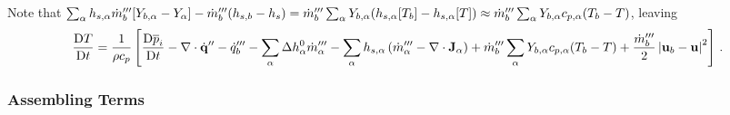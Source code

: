 \documentclass[11pt]{book}
\begin{document}
Note that $\sum_\alpha h_{s,\alpha} \dot{m}_{b}^{{\prime\prime\prime}}[Y_{b,\alpha} - Y_\alpha] - \dot{m}_{b}^{{\prime\prime\prime}} ( h_{s,b} - h_s ) = \dot{m}_{b}^{{\prime\prime\prime}} \sum_\alpha Y_{b,\alpha} (h_{s,\alpha}[T_b] - h_{s,\alpha}[T]) \approx \dot{m}_{b}^{{\prime\prime\prime}} \sum_\alpha Y_{b,\alpha} c_{p,\alpha}(T_b-T)$, leaving
\begin{equation}
\label{eqn_DTDt}
\frac{\mbox{D} T}{\mbox{D} t} = \frac{1}{\rho c_p} \left[\frac{\mbox{D} \overline{p}_i }{\mbox{D} t}
- \Div\dot{\mathbf{q}}^{\prime\prime} - \dq_b''' - \sum_\alpha \Delta h^0_\alpha \dot{m}_\alpha^{\tripleprime} - \sum_\alpha h_{s,\alpha}\left(  \dot{m}_\alpha^{\tripleprime} - \Div \mathbf{J}_{\alpha} \right) + \dot{m}_{b}^{\tripleprime} \sum_\alpha Y_{b,\alpha} c_{p,\alpha}(T_b-T) + \frac{\dot{m}_{b}^{\tripleprime}}{2}\left|\mathbf{u}_b-\mathbf{u}\right|^2 \right] \,\mbox{.} \nonumber \vspace{0.3cm} \\
\end{equation}

\subsubsection{Assembling Terms}
\label{putting_it_all_together}
\end{document}
